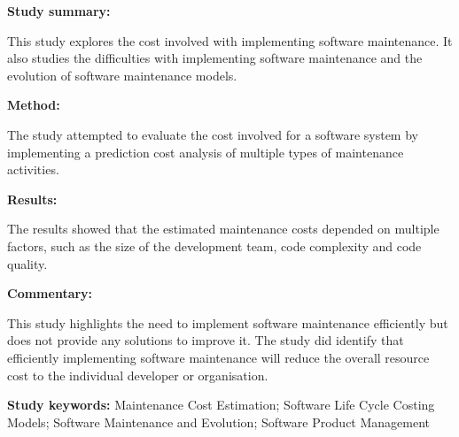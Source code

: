 \begin{tcolorbox}[colback=gray!5!white, colframe=pastelgreen!40!black, title=A cost model for software maintenance \& evolution\cite{Sneed2004}]
	\begin{minipage}[t]{0.25\textwidth}
		\textbf{Study summary:}
	\end{minipage}
	\hfill
	\begin{minipage}[t]{0.65\textwidth}
		This study explores the cost involved with implementing software maintenance. It also
		studies the difficulties with implementing software maintenance and the evolution of
		software maintenance models. 
	\end{minipage}

	\vspace{0.75em} 

	\begin{minipage}[t]{0.25\textwidth}
		\textbf{Method:}
	\end{minipage}
	\hfill
	\begin{minipage}[t]{0.65\textwidth}
		The study attempted to evaluate the cost involved for a software system by implementing a prediction cost analysis of multiple types of maintenance activities.
	\end{minipage}

	\vspace{0.75em} 

	\begin{minipage}[t]{0.25\textwidth}
		\textbf{Results:}
	\end{minipage}
	\hfill
	\begin{minipage}[t]{0.65\textwidth}
		The results showed that the estimated maintenance costs depended on multiple factors, such as the size of the development team, code complexity and code quality.
	\end{minipage}

	\vspace{0.75em} 

	\begin{minipage}[t]{0.25\textwidth}
		\textbf{Commentary:}
	\end{minipage}
	\hfill
	\begin{minipage}[t]{0.65\textwidth}
		This study highlights the need to implement software maintenance efficiently but does not
		provide any solutions to improve it. The study did identify that efficiently implementing
		software maintenance will reduce the overall resource cost to the individual developer or
		organisation.
	\end{minipage}
	\tcblower
	\textbf{Study keywords:} Maintenance Cost Estimation; Software Life Cycle Costing Models;
	Software Maintenance and Evolution; Software Product Management
\end{tcolorbox}


